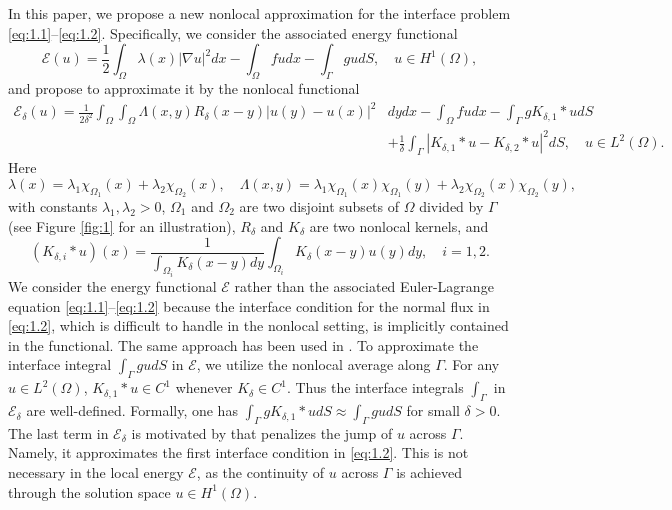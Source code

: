\documentclass{article}
\theoremstyle{definition}
\begin{document}
In this paper, we propose a new nonlocal approximation for the interface problem \eqref{eq:1.1}--\eqref{eq:1.2}. Specifically, we consider the associated energy functional
\[
\mathcal{E}(u)
=\frac{1}{2}\int_\Omega\lambda(x)|\nabla u|^2dx -\int_\Omega fudx-\int_\Gamma gudS,\quad u\in H^1(\Omega),
\]
and propose to approximate it by the nonlocal functional
\begin{align*}
  \mathcal{E}_\delta(u)=
    \frac{1}{2\delta^2}\int_{\Omega}\int_{\Omega}\Lambda(x,y)R_\delta(x-y)|u(y)-u(x)|^2&dydx
-\int_{\Omega}fudx
-\int_\Gamma g K_{\delta,1}\ast u dS \\
&+\frac{1}{\delta}
\int_\Gamma\left|K_{\delta,1}\ast u-K_{\delta,2}\ast u\right|^2dS,\quad u\in L^2(\Omega).
\end{align*}
Here
\[
\lambda(x)=\lambda_1\chi_{\Omega_1}(x)+\lambda_2\chi_{\Omega_2}(x),\quad
\Lambda(x,y)=\lambda_1\chi_{\Omega_1}(x)\chi_{\Omega_1}(y)
+\lambda_2\chi_{\Omega_2}(x)\chi_{\Omega_2}(y),
\]
with constants $\lambda_1,\lambda_2>0$, $\Omega_1$ and $\Omega_2$ are two disjoint subsets of $\Omega$ divided by $\Gamma$ (see Figure \ref{fig:1} for an illustration),
$R_\delta$ and $K_\delta$ are two nonlocal kernels, and
\[
\left(K_{\delta,i}\ast u\right)(x)
=\frac{1}{\int_{\Omega_i}K_\delta(x-y)dy}\int_{\Omega_i}K_\delta(x-y)u(y)dy,\quad i=1,2.
\]
We consider the energy functional $\mathcal{E}$ rather than the associated Euler-Lagrange equation \eqref{eq:1.1}--\eqref{eq:1.2} because the interface condition for the normal flux in \eqref{eq:1.2}, which is difficult to handle in the nonlocal setting, is implicitly contained in the functional.
The same approach has been used in \cite{capodaglio2020energy}.
To approximate the interface integral $\int_\Gamma gudS$ in $\mathcal{E}$, we utilize the nonlocal average along $\Gamma$.
For any $u\in L^2(\Omega)$, $K_{\delta,1}\ast u\in C^1$ whenever $K_\delta\in C^1$. Thus the interface integrals $\int_\Gamma$ in $\mathcal{E}_\delta$ are well-defined.
Formally, one has $ \int_\Gamma g K_{\delta,1}\ast u dS \approx \int_\Gamma gudS$
for small $\delta>0$.
The last term in $\mathcal{E}_\delta$ is motivated by \cite{wang2023nonlocal,gan2024convergence} that penalizes the jump of $u$ across $\Gamma$.
Namely, it approximates the first interface condition in \eqref{eq:1.2}.
This is not necessary in the local energy $\mathcal{E}$, as the continuity of $u$ across $\Gamma$ is achieved through the solution space $u\in H^1(\Omega)$.
\end{document}
